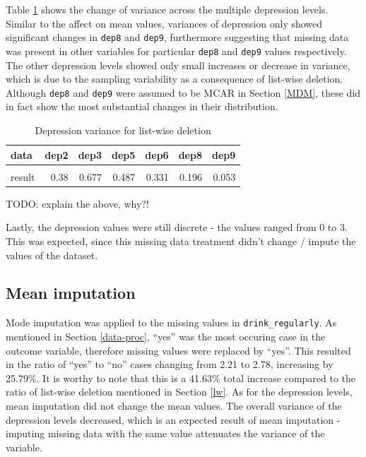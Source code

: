 \documentclass[
]{article}
\begin{document}
Table \ref{tab:dep-vars-lw} shows the change of variance across the multiple depression levels. Similar to the affect on mean values, variances of depression only showed significant changes in \texttt{dep8} and \texttt{dep9}, furthermore suggesting that missing data was present in other variables for particular \texttt{dep8} and \texttt{dep9} values respectively. The other depression levels showed only small increases or decrease in variance, which is due to the sampling variability as a consequence of list-wise deletion. Although \texttt{dep8} and \texttt{dep9} were assumed to be MCAR in Section \ref{MDM}, these did in fact show the most substantial changes in their distribution.

\begin{table}[!h]

\caption{\label{tab:dep-vars-lw}Depression variance for list-wise deletion}
\centering
\begin{tabular}[t]{lrrrrrr}
\toprule
data & dep2 & dep3 & dep5 & dep6 & dep8 & dep9\\
\midrule
\cellcolor{gray!6}{original} & \cellcolor{gray!6}{0.34} & \cellcolor{gray!6}{0.733} & \cellcolor{gray!6}{0.494} & \cellcolor{gray!6}{0.318} & \cellcolor{gray!6}{0.344} & \cellcolor{gray!6}{0.138}\\
result & 0.38 & 0.677 & 0.487 & 0.331 & 0.196 & 0.053\\
\bottomrule
\end{tabular}
\end{table}

TODO: explain the above, why?!

Lastly, the depression values were still discrete - the values ranged from 0 to 3. This was expected, since this missing data treatment didn't change / impute the values of the dataset.

\hypertarget{mean-imputation}{%
\subsection{Mean imputation}\label{mean-imputation}}

Mode imputation was applied to the missing values in \texttt{drink\_regularly}. As mentioned in Section \ref{data-proc}, ``yes'' was the most occuring case in the outcome variable, therefore missing values were replaced by ``yes''. This resulted in the ratio of ``yes'' to ``no'' cases changing from 2.21 to 2.78, increasing by 25.79\%. It is worthy to note that this is a 41.63\% total increase compared to the ratio of list-wise deletion mentioned in Section \ref{lw}.
As for the depression levels, mean imputation did not change the mean values. The overall variance of the depression levels decreased, which is an expected result of mean imputation - imputing missing data with the same value attenuates the variance of the variable.
\end{document}
